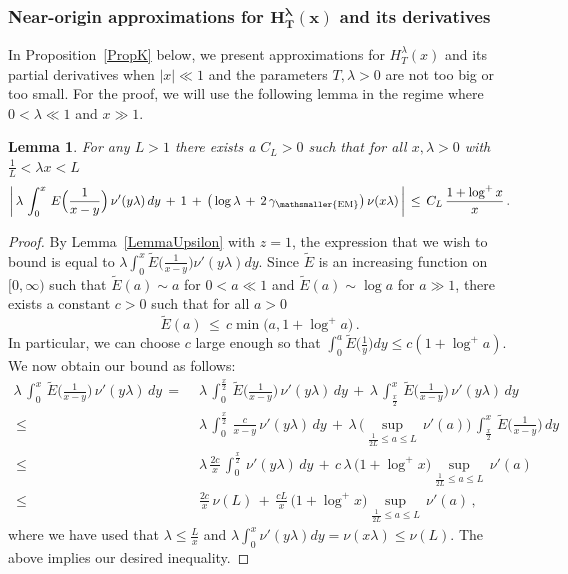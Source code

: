 \documentclass[10pt]{article}
\numberwithin{equation}{section}
\newtheorem{lemma}[theorem]{Lemma}
\theoremstyle{definition}
\begin{document}
\subsubsection{Near-origin approximations for $ \boldsymbol{H_{ T}^{\lambda}(x)} $ and its derivatives}  \label{SubsubHApprox}

In Proposition~\ref{PropK} below, we present approximations for $H_{ T}^{\lambda}(x)$ and its partial derivatives when $|x|\ll 1$ and the parameters $T,\lambda>0$ are not too big or too small.  For the proof, we will use the following lemma in the regime where $ 0 < \lambda  \ll 1 $ and $x\gg 1$.
\begin{lemma}\label{LemmaUpsilonApprox} For any $L>1$ there exists a  $C_L>0$ such that for all $x,\lambda >0$ with  $\frac{1}{L}<\lambda x< L$
\begin{align}\label{Tris}
\bigg|\,\lambda  \,\int_0^{x}\,E \Big(\frac{1}{x-y}\Big)\,\nu'( y \lambda)\,dy\,+\,1\, +\,\big(\log\lambda \,+\,2\,\gamma_{\mathsmaller{\textup{EM}}}\big) \,\nu( x \lambda)\,\bigg|\,\leq \,C_L\,\frac{1+\log^+ x}{x} \,.
\end{align}
\end{lemma}

\begin{proof} By Lemma~\ref{LemmaUpsilon} with $z=1$, the expression that we wish to  bound is equal to $\lambda \int_0^{x} \widetilde{E} \big(\frac{1}{x- y} \big) \nu'( y\lambda)dy$.  Since $\widetilde{E}$ is an increasing function on $[0,\infty)$ such that  $\widetilde{E} (a)\sim a$ for $0<a\ll 1$  and   $\widetilde{E} (a)\sim \log a$ for $a\gg 1$,  there exists a constant $c>0$ such that for all $a>0$
$$  \widetilde{E} (a)\,\leq  \,  c \min \big(a, 1+\log^+ a\big) \,. $$
In particular, we can choose $c$ large enough so that $\int_0^a \widetilde{E}\big(\frac{1}{y}\big)dy\leq c(1+\log^+ a   ) $.  We  now obtain our bound as follows:
\begin{align*}
\lambda \,\int_{0}^{x }\,\widetilde{E} \Big(\frac{1}{x- y} \Big)\,  \nu'( y\lambda)\,dy \,= \,&\,\lambda \,\int_{0}^{\frac{x}{2} }\,\widetilde{E} \Big(\frac{1}{x- y} \Big) \, \nu'(y\lambda )\,dy\,+\, \lambda\, \int_{\frac{x}{2} }^{x }\,\widetilde{E} \Big(\frac{1}{x- y} \Big)\,  \nu'( y\lambda)\,dy  \\ \,\leq\,&\, \lambda \,\int^{\frac{x}{2} }_{0} \,\frac{ c}{ x- y } \, \nu'( y\lambda) \,dy \,+\,\lambda\, \bigg(\sup_{\frac{1}{2L}\leq a\leq L }\,\nu'(a)\bigg)\,\int_{\frac{x}{2} }^{x}\,\widetilde{E} \Big(\frac{1}{x- y} \Big)\,dy \\ \,\leq \,& \,\lambda \,\frac{ 2c}{ x  }\,\int^{\frac{x}{2} }_{0}  \,\nu'( y\lambda)\, dy \,+\, c\, \lambda \,\big(1+\log^+ x\big)  \sup_{\frac{1}{2L}\leq a\leq L }\,\nu'(a) \\  \,\leq\,&\,\frac{2c }{x} \,\nu(L)\,+\, \frac{cL}{x}\,\big(1+\log^+ x\big) \sup_{\frac{1}{2L}\leq a\leq L }\,\nu'(a) \,,
\end{align*}
where we have used that $\lambda\leq \frac{L}{x}$ and  $\lambda  \int^{x }_{0} \nu'( y\lambda) dy =\nu(x\lambda )\leq \nu(L)$.  The above implies our desired inequality.
\end{proof}
\end{document}
